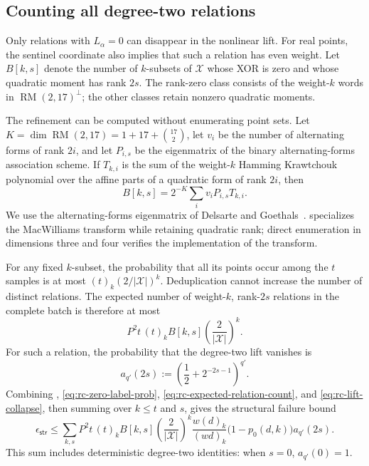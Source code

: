 \subsection{Counting all degree-two relations}

Only relations with $L_\alpha=0$ can disappear in the nonlinear lift.  For
real points, the sentinel coordinate also implies that such a relation has
even weight.  Let $B[k,s]$ denote the number of $k$-subsets of $\mathcal X$
whose XOR is zero and whose quadratic moment has rank $2s$.  The rank-zero
class consists of the weight-$k$ words in $\operatorname{RM}(2,17)^\perp$;
the other classes retain nonzero quadratic moments.

The refinement can be computed without enumerating point sets.  Let
$K=\dim\operatorname{RM}(2,17)=1+17+\binom{17}{2}$, let $v_i$ be the number of
alternating forms of rank $2i$, and let $P_{i,s}$ be the eigenmatrix of the
binary alternating-forms association scheme.  If $T_{k,i}$ is the sum of the
weight-$k$ Hamming Krawtchouk polynomial over the affine parts of a quadratic
form of rank $2i$, then
\begin{equation}\label{eq:rc-rank-enumerator}
 B[k,s]=2^{-K}\sum_i v_iP_{i,s}T_{k,i}.
\end{equation}
We use the alternating-forms eigenmatrix of Delsarte and
Goethals~\cite{delsarteGoethals1975}.  
specializes the MacWilliams transform while retaining quadratic rank; direct
enumeration in dimensions three and four verifies the implementation of the
transform.

For any fixed $k$-subset, the probability that all its points occur among
the $t$ samples is at most $(t)_k(2/|\mathcal X|)^k$.  Deduplication cannot increase the
number of distinct relations.  The expected number of weight-$k$, rank-$2s$
relations in the complete batch is therefore at most
\begin{equation}\label{eq:rc-expected-relation-count}
 P^2t\,(t)_k B[k,s]\left(\frac{2}{|\mathcal X|}\right)^k.
\end{equation}
For such a relation, the probability that the degree-two lift vanishes is
\begin{equation}\label{eq:rc-lift-collapse}
 a_{q'}(2s):=\left(\frac12+2^{-2s-1}\right)^{q'}.
\end{equation}
Combining ,
\eqref{eq:rc-zero-label-prob}, \eqref{eq:rc-expected-relation-count}, and
\eqref{eq:rc-lift-collapse}, then summing over $k\leq t$ and $s$, gives the
structural failure bound
\begin{equation}\label{eq:rc-structural-bound}
 \epsilon_{\mathsf{str}}\leq
 \sum_{k,s} P^2t\,(t)_k B[k,s]
 \left(\frac{2}{|\mathcal X|}\right)^k
 \frac{w(d)_k}{(wd)_k}
 \bigl(1-p_0(d,k)\bigr)a_{q'}(2s).
\end{equation}
This sum includes deterministic degree-two identities: when $s=0$,
$a_{q'}(0)=1$.


